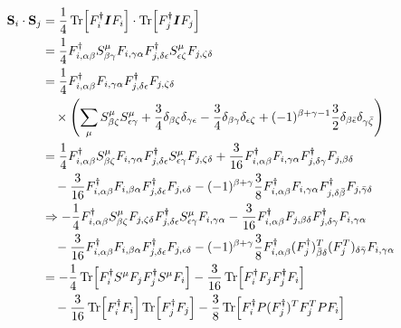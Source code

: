 \documentclass[11pt, aps, longbibliography]{article}
\begin{document}
        \begin{align}\label{eq:highS-MF-12}
            \mathbf{S}_i \cdot \mathbf{S}_j &= \frac{1}{4} \Tr[F_i^\dagger \boldsymbol{I}F_i]\cdot \Tr[F_j^\dagger \boldsymbol{I}F_j] \notag \\
            &= \frac{1}{4}F_{i,\alpha\beta}^\dagger S_{\beta\gamma}^\mu F_{i,\gamma\alpha}F_{j,\delta\epsilon}^\dagger S_{\epsilon\zeta}^\mu F_{j,\zeta\delta} \notag \\
            &= \frac{1}{4}F_{i,\alpha\beta}^\dagger F_{i,\gamma\alpha}F_{j,\delta\epsilon}^\dagger F_{j,\zeta\delta} \notag \\
            &\quad \times \left( \sum_{\mu}S_{\beta\zeta}^\mu S_{\epsilon\gamma}^\mu + \frac{3}{4}\delta_{\beta\zeta}\delta_{\gamma\epsilon} - \frac{3}{4}\delta_{\beta\gamma}\delta_{\epsilon\zeta} + (-1)^{\beta+\gamma-1}\frac{3}{2}\delta_{\beta\bar{\epsilon}}\delta_{\gamma\bar{\zeta}} \right) \notag \\
            &= \frac{1}{4} F^{\dagger}_{i,\alpha\beta} S_{\beta\zeta}^\mu F_{i,\gamma\alpha} F_{j,\delta\epsilon}^\dagger S_{\epsilon\gamma}^\mu F_{j,\zeta\delta} + \frac{3}{16} F_{i,\alpha\beta}^\dagger F_{i,\gamma\alpha} F_{j,\delta \gamma}^\dagger F_{j,\beta\delta}  \notag \\
            & \quad - \frac{3}{16} F_{i,\alpha\beta}^\dagger F_{i,\beta\alpha} F_{j,\delta\epsilon}^\dagger F_{j,\epsilon\delta} - (-1)^{\beta+\gamma}\frac{3}{8}F_{i,\alpha\beta}^\dagger F_{i,\gamma \alpha} F_{j,\delta\bar{\beta}}^\dagger F_{j,\bar{\gamma}\delta} \notag \\
            &\Rightarrow  -\frac{1}{4} F^{\dagger}_{i,\alpha\beta} S_{\beta\zeta}^\mu F_{j,\zeta\delta} F_{j,\delta\epsilon}^\dagger S_{\epsilon\gamma}^\mu  F_{i,\gamma\alpha} - \frac{3}{16} F_{i,\alpha\beta}^\dagger F_{j,\beta\delta} F_{j,\delta \gamma}^\dagger F_{i,\gamma\alpha}   \notag \\
            & \quad - \frac{3}{16} F_{i,\alpha\beta}^\dagger F_{i,\beta\alpha} F_{j,\delta\epsilon}^\dagger F_{j,\epsilon\delta} - (-1)^{\beta+\gamma}\frac{3}{8}F_{i,\alpha\beta}^\dagger (F_j^\dagger)^T_{\bar{\beta}\delta} (F_{j}^T)_{\delta\bar{\gamma}}  F_{i,\gamma \alpha} \notag \\
            &= -\frac{1}{4}\Tr[F_i^\dagger S^\mu F_j F_j^\dagger S^\mu F_i] - \frac{3}{16}\Tr[F_i^\dagger F_j F_j^\dagger F_i] \notag \\
            & \quad  - \frac{3}{16} \Tr[F_i^\dagger F_i]\Tr[F_j^\dagger F_j] - \frac{3}{8}\Tr[F_i^\dagger P (F_j^\dagger)^T F_j^T P F_i] 
        \end{align}
\end{document}
